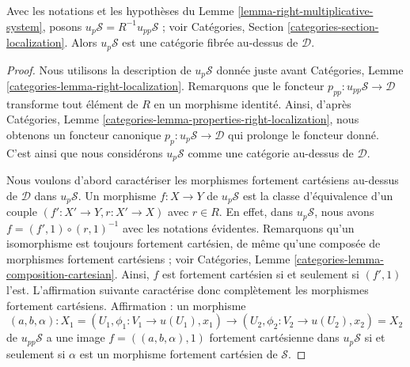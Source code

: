 \begin{lemma}
\label{lemma-fibred-category-pullback}
Avec les notations et les hypothèses du
Lemme \ref{lemma-right-multiplicative-system},
posons $u_p\mathcal{S} = R^{-1}u_{pp}\mathcal{S}$ ; voir
Catégories, Section \ref{categories-section-localization}.
Alors $u_p\mathcal{S}$ est une catégorie fibrée au-dessus de $\mathcal{D}$.
\end{lemma}

\begin{proof}
Nous utilisons la description de $u_p\mathcal{S}$ donnée juste avant
Catégories, Lemme \ref{categories-lemma-right-localization}.
Remarquons que le foncteur $p_{pp} : u_{pp}\mathcal{S} \to \mathcal{D}$
transforme tout élément de $R$ en un morphisme identité.
Ainsi, d'après
Catégories, Lemme \ref{categories-lemma-properties-right-localization},
nous obtenons un foncteur canonique $p_p : u_p\mathcal{S} \to \mathcal{D}$
qui prolonge le foncteur donné. C'est ainsi que nous considérons
$u_p\mathcal{S}$ comme une catégorie au-dessus de $\mathcal{D}$.

\medskip\noindent
Nous voulons d'abord caractériser les morphismes fortement cartésiens au-dessus de $\mathcal{D}$
dans $u_p\mathcal{S}$.
Un morphisme $f : X \to Y$ de $u_p\mathcal{S}$ est la classe d'équivalence
d'un couple $(f' : X' \to Y, r : X' \to X)$ avec $r \in R$.
En effet, dans $u_p\mathcal{S}$, nous avons $f = (f', 1) \circ (r, 1)^{-1}$
avec les notations évidentes.
Remarquons qu'un isomorphisme est toujours fortement cartésien, de même qu'une
composée de morphismes fortement cartésiens ; voir
Catégories, Lemme \ref{categories-lemma-composition-cartesian}.
Ainsi, $f$ est fortement cartésien si et seulement si $(f', 1)$ l'est.
L'affirmation suivante caractérise donc complètement les morphismes fortement cartésiens.
Affirmation : un morphisme
$$
(a, b, \alpha) :
X_1 = (U_1, \phi_1 : V_1 \to u(U_1), x_1)
\longrightarrow
(U_2, \phi_2 : V_2 \to u(U_2), x_2) = X_2
$$
de $u_{pp}\mathcal{S}$ a une image $f = ((a, b, \alpha), 1)$
fortement cartésienne dans $u_p\mathcal{S}$ si et seulement si $\alpha$
est un morphisme fortement cartésien de $\mathcal{S}$.


\end{proof}
